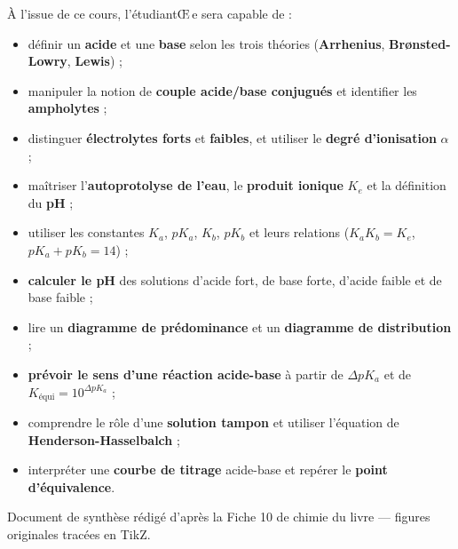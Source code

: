 \documentclass[11pt,a4paper]{article}
\begin{document}
\begin{tcolorbox}[boxbase,colback=primary!5,colframe=primary,width=15.2cm,
    title={\textsc{Objectifs pédagogiques de la fiche}}]
À l'issue de ce cours, l'étudiant{\OE}\,e sera capable de :
\begin{itemize}[leftmargin=1.6em,topsep=2pt,itemsep=1pt]
  \item définir un \textbf{acide} et une \textbf{base} selon les trois théories (\textbf{Arrhenius}, \textbf{Brønsted-Lowry}, \textbf{Lewis}) ;
  \item manipuler la notion de \textbf{couple acide/base conjugués} et identifier les \textbf{ampholytes} ;
  \item distinguer \textbf{électrolytes forts} et \textbf{faibles}, et utiliser le \textbf{degré d'ionisation} $\alpha$ ;
  \item maîtriser l'\textbf{autoprotolyse de l'eau}, le \textbf{produit ionique} $K_e$ et la définition du \textbf{pH} ;
  \item utiliser les constantes $K_a$, $pK_a$, $K_b$, $pK_b$ et leurs relations ($K_a K_b = K_e$, $pK_a + pK_b = 14$) ;
  \item \textbf{calculer le pH} des solutions d'acide fort, de base forte, d'acide faible et de base faible ;
  \item lire un \textbf{diagramme de prédominance} et un \textbf{diagramme de distribution} ;
  \item \textbf{prévoir le sens d'une réaction acide-base} à partir de $\Delta pK_a$ et de $K_{\text{équi}} = 10^{\Delta pK_a}$ ;
  \item comprendre le rôle d'une \textbf{solution tampon} et utiliser l'équation de \textbf{Henderson-Hasselbalch} ;
  \item interpréter une \textbf{courbe de titrage} acide-base et repérer le \textbf{point d'équivalence}.
\end{itemize}
\end{tcolorbox}

\vspace{0.4cm}
{\small\color{black!60} Document de synthèse rédigé d'après la Fiche 10 de chimie du livre — figures originales tracées en TikZ.}
\par
\endgroup

\newpage
\renewcommand{\contentsname}{\textcolor{primarydark}{Table des matières}}
\tableofcontents
\thispagestyle{fancy}
\newpage
\end{document}
